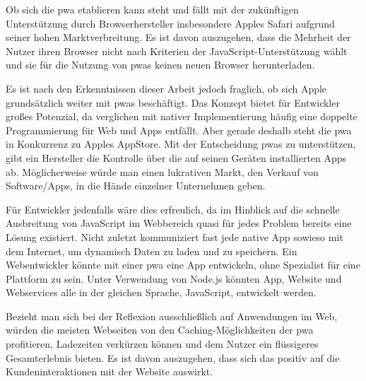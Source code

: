 Ob sich die \ac{pwa} etablieren kann steht und fällt mit der zukünftigen Unterstützung durch Browserhersteller insbesondere Apples Safari aufgrund seiner hohen Marktverbreitung. Es ist davon auszugehen, dass die Mehrheit der Nutzer ihren Browser nicht nach Kriterien der JavaScript-Unterstützung wählt und sie für die Nutzung von \ac{pwa}s keinen neuen Browser herunterladen.

Es ist nach den Erkenntnissen dieser Arbeit jedoch fraglich, ob sich Apple grundsätzlich weiter mit \ac{pwa}s beschäftigt. Das Konzept bietet für Entwickler großes Potenzial, da verglichen mit nativer Implementierung häufig eine doppelte Programmierung für Web und Apps entfällt. Aber gerade deshalb steht die \ac{pwa} in Konkurrenz zu Apples AppStore. Mit der Entscheidung \ac{pwa}s zu unterstützen, gibt ein Hersteller die Kontrolle über die auf seinen Geräten installierten Apps ab. 
Möglicherweise würde man einen lukrativen Markt, den Verkauf von Software/Apps, in die Hände einzelner Unternehmen geben.

Für Entwickler jedenfalls wäre dies erfreulich, da im Hinblick auf die schnelle Ausbreitung von JavaScript im Webbereich quasi für jedes Problem bereits eine Lösung existiert. Nicht zuletzt kommuniziert fast jede native App sowieso mit dem Internet, um dynamisch Daten zu laden und zu speichern. Ein Webentwickler könnte mit einer \ac{pwa} eine App entwickeln, ohne Spezialist für eine Plattform zu sein. Unter Verwendung von Node.js könnten App, Website und Webservices alle in der gleichen Sprache, JavaScript, entwickelt werden.

Bezieht man sich bei der Reflexion ausschließlich auf Anwendungen im Web, würden die meisten Webseiten von den Caching-Möglichkeiten der \ac{pwa} profitieren, Ladezeiten verkürzen können und dem Nutzer ein flüssigeres Gesamterlebnis bieten. Es ist davon auszugehen, dass sich das positiv auf die Kundeninteraktionen mit der Website auswirkt.